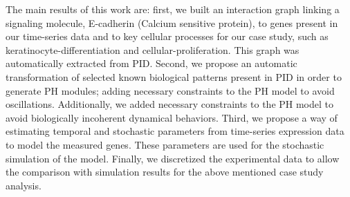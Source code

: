 The main  results of this work are: first, we built an interaction graph linking a signaling molecule, 
E-cadherin (Calcium sensitive protein), to genes present in our time-series data and to key cellular processes for our case study, such as 
keratinocyte-differentiation and cellular-proliferation.  This graph was automatically extracted from PID. Second, we propose an automatic                                     %
transformation of selected known biological patterns present in  PID in order to generate PH modules;
 adding necessary constraints to the PH model to avoid oscillations. Additionally,                                                 %
we added necessary constraints to the PH model to avoid biologically incoherent dynamical behaviors.  
Third, we propose a way of estimating temporal and stochastic parameters from time-series expression data to 
model the measured genes.  These parameters are used for the stochastic simulation of the model.  Finally, 
we discretized the experimental data to allow the comparison with simulation results for the above mentioned case 
study analysis. 


 
